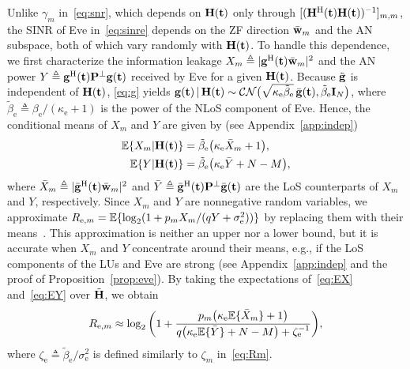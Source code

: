 \documentclass[journal]{IEEEtran}
\newcommand{\rev}[1]{{\color{red}#1}}
\newcommand{\rev}[1]{#1}
\begin{document}
Unlike $\gamma_m$ in~\eqref{eq:snr}, which depends on $\mathbf{H}(\mathbf{t})$ only through $[(\mathbf{H}^{\mathrm H}(\mathbf{t})\mathbf{H}(\mathbf{t}))^{-1}]_{m,m}$, the SINR of Eve in~\eqref{eq:sinre} depends on the ZF direction $\bar{\mathbf{w}}_m$ and the AN subspace, both of which vary randomly with $\mathbf{H}(\mathbf{t})$. To handle this dependence, we first characterize the information leakage $X_m\triangleq|\mathbf{g}^{\mathrm H}(\mathbf{t})\bar{\mathbf{w}}_m|^2$ and the AN power $Y\triangleq\mathbf{g}^{\mathrm H}(\mathbf{t})\mathbf{P}^{\perp}\mathbf{g}(\mathbf{t})$ received by Eve for a given $\mathbf{H}(\mathbf{t})$. Because $\tilde{\mathbf{g}}$ is independent of $\mathbf{H}(\mathbf{t})$, \eqref{eq:g} yields $\mathbf{g}(\mathbf{t})\,|\,\mathbf{H}(\mathbf{t})\sim\mathcal{CN}\big(\sqrt{\kappa_{\mathrm e}\tilde\beta_{\mathrm e}}\,\bar{\mathbf{g}}(\mathbf{t}),\tilde\beta_{\mathrm e}\mathbf{I}_N\big)$, where $\tilde\beta_{\mathrm e}\triangleq\beta_{\mathrm e}/(\kappa_{\mathrm e}+1)$ is the power of the NLoS component of Eve. Hence, the conditional means of $X_m$ and $Y$ are given by (see Appendix~\ref{app:indep})
\begin{align}
\mathbb{E}\{X_m|\mathbf{H}(\mathbf{t})\}&=\tilde\beta_{\mathrm e}\big(\kappa_{\mathrm e}\bar X_m+1\big),\label{eq:EX}\\
\mathbb{E}\{Y|\mathbf{H}(\mathbf{t})\}&=\tilde\beta_{\mathrm e}\big(\kappa_{\mathrm e}\bar Y+N-M\big),\label{eq:EY}
\end{align}
where $\bar X_m\triangleq|\bar{\mathbf{g}}^{\mathrm H}(\mathbf{t})\bar{\mathbf{w}}_m|^2$ and $\bar Y\triangleq\bar{\mathbf{g}}^{\mathrm H}(\mathbf{t})\mathbf{P}^{\perp}\bar{\mathbf{g}}(\mathbf{t})$ are the LoS counterparts of $X_m$ and $Y$, respectively. Since $X_m$ and $Y$ are nonnegative random variables, we approximate $R_{\mathrm{e},m}=\mathbb{E}\{\log_2(1+p_mX_m/(qY+\sigma_{\mathrm e}^2))\}$ by replacing them with their means~\cite[Lemma~1]{ZhangJSTSP2014}. This approximation is neither an upper nor a lower bound, but it is accurate when $X_m$ and $Y$ concentrate around their means, e.g., \rev{if the LoS components of the LUs and Eve are strong} (see Appendix~\ref{app:indep} \rev{and the proof of Proposition~\ref{prop:eve}}). By taking the expectations of~\eqref{eq:EX} and~\eqref{eq:EY} over $\tilde{\mathbf{H}}$, we obtain
\begin{equation}\label{eq:Re0}
R_{\mathrm{e},m}\approx\log_2\bigg(1+\frac{p_m\big(\kappa_{\mathrm e}\mathbb{E}\{\bar X_m\}+1\big)}{q\big(\kappa_{\mathrm e}\mathbb{E}\{\bar Y\}+N-M\big)+\zeta_{\mathrm e}^{-1}}\bigg),
\end{equation}
where $\zeta_{\mathrm e}\triangleq\tilde\beta_{\mathrm e}/\sigma_{\mathrm e}^2$ is defined similarly to $\zeta_m$ in~\eqref{eq:Rm}.
\end{document}
